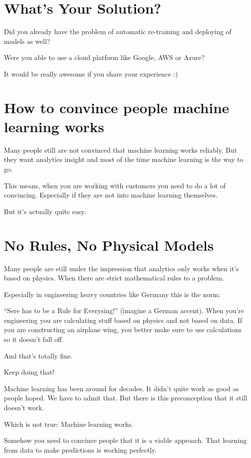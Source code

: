 \documentclass[12pt, numbers=noenddot]{scrreprt} %
\begin{document}
\section{What’s Your Solution?}

Did you already have the problem of automatic re-training and deploying of models as well?

Were you able to use a cloud platform like Google, AWS or Azure?

It would be really awesome if you share your experience :)

\section{How to convince people machine learning works}
Many people still are not convinced that machine learning works reliably. But they want analytics insight and most of the time machine learning is the way to go.

This means, when you are working with customers you need to do a lot of convincing. Especially if they are not into machine learning themselves.

But it's actually quite easy.

\section{No Rules, No Physical Models}

Many people are still under the impression that analytics only works when it’s based on physics. When there are strict mathematical rules to a problem.

Especially in engineering heavy countries like Germany this is the norm:

“Sere has to be a Rule for Everysing!” (imagine a German accent).
When you’re engineering you are calculating stuff based on physics and not based on data. If you are constructing an airplane wing, you better make sure to use calculations so it doesn’t fall off.

And that’s totally fine.

Keep doing that!

Machine learning has been around for decades. It didn’t quite work as good as people hoped. We have to admit that. But there is this preconception that it still doesn’t work.

Which is not true: Machine learning works.

Somehow you need to convince people that it is a viable approach. That learning from data to make predictions is working perfectly.
\end{document}
